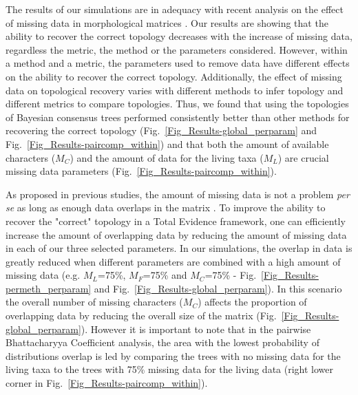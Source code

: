 \documentclass[12pt,letterpaper]{article}
\begin{document}
The results of our simulations are in adequacy with recent analysis on the effect of missing data in morphological matrices \citep{pattinsonphylogeny2014,wrightbayesian2014,sansombias2014}. Our results are showing that the ability to recover the correct topology decreases with the increase of missing data, regardless the metric, the method or the parameters considered.
However, within a method and a metric, the parameters used to remove data have different effects on the ability to recover the correct topology.
Additionally, the effect of missing data on topological recovery varies with different methods to infer topology and different metrics to compare topologies.
Thus, we found that using the topologies of Bayesian consensus trees performed consistently better than other methods for recovering the correct topology (Fig.~\ref{Fig_Results-global_perparam} and Fig.~\ref{Fig_Results-paircomp_within}) and that both the amount of available characters ($M_{C}$) and the amount of data for the living taxa ($M_{L}$) are crucial missing data parameters (Fig.~\ref{Fig_Results-paircomp_within}).


As proposed in previous studies, the amount of missing data is not a problem \textit{per se} as long as enough data overlaps in the matrix \citep[e.g.][]{kearneyfragmentary2002,wiensmissing2003,rouresite-specific2011,pattinsonphylogeny2014}. %
To improve the ability to recover the "correct" topology in a Total Evidence framework, one can efficiently increase the amount of overlapping data by reducing the amount of missing data in each of our three selected parameters. In our simulations, the overlap in data is greatly reduced when different parameters are combined with a high amount of missing data (e.g. $M_{L}$=75\%, $M_{F}$=75\% and $M_{C}$=75\% - Fig.~\ref{Fig_Results-permeth_perparam} and Fig.~\ref{Fig_Results-global_perparam}). In this scenario the overall number of missing characters ($M_{C}$) affects the proportion of overlapping data by reducing the overall size of the matrix (Fig.~\ref{Fig_Results-global_perparam}). However it is important to note that in the pairwise Bhattacharyya Coefficient analysis, the area with the lowest probability of distributions overlap is led by comparing the trees with no missing data for the living taxa to the trees with 75\% missing data for the living data (right lower corner in Fig.~\ref{Fig_Results-paircomp_within}).
\end{document}
